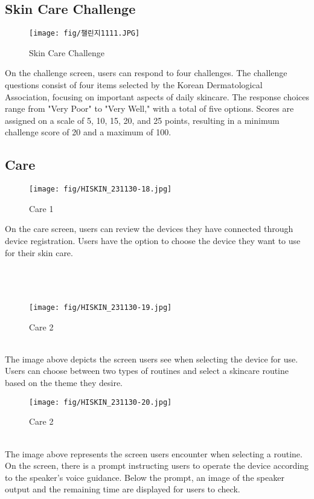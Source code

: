 \documentclass[conference]{IEEEtran}
\begin{document}
\subsection{Skin Care Challenge}
\begin{figure}[h]
    \centering
    \texttt{[image: fig/챌린지1111.JPG]}
    \label{fig:Skin Care Challenge}
    \caption{Skin Care Challenge} 
    \end{figure}
On the challenge screen, users can respond to four challenges. The challenge questions consist of four items selected by the Korean Dermatological Association, focusing on important aspects of daily skincare. The response choices range from "Very Poor" to "Very Well," with a total of five options. Scores are assigned on a scale of 5, 10, 15, 20, and 25 points, resulting in a minimum challenge score of 20 and a maximum of 100.

\subsection{Care}
\begin{figure}[h]
    \centering
    \texttt{[image: fig/HISKIN\_231130-18.jpg]}
    \label{fig:Care 1}
    \caption{Care 1} 
    \end{figure}
On the care screen, users can review the devices they have connected through device registration. Users have the option to choose the device they want to use for their skin care.\\  \\ \\ \\
\begin{figure}[h]
    \centering
    \texttt{[image: fig/HISKIN\_231130-19.jpg]}
    \label{fig:Care 2}
    \caption{Care 2} 
    \end{figure}
\\The image above depicts the screen users see when selecting the device for use. Users can choose between two types of routines and select a skincare routine based on the theme they desire.
\begin{figure}[h]
    \centering
    \texttt{[image: fig/HISKIN\_231130-20.jpg]}
    \label{fig:Care 2}
    \caption{Care 2} 
    \end{figure}
\\The image above represents the screen users encounter when selecting a routine. On the screen, there is a prompt instructing users to operate the device according to the speaker's voice guidance. Below the prompt, an image of the speaker output and the remaining time are displayed for users to check. \\ \\ \\
\end{document}
